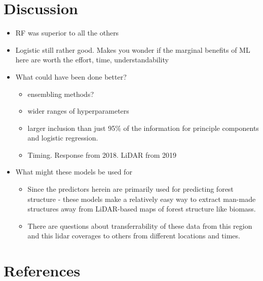 \documentclass[]{elsarticle} %
\providecommand{\tightlist}{%
  \setlength{\itemsep}{0pt}\setlength{\parskip}{0pt}}
\begin{document}
\hypertarget{discussion}{%
\section{Discussion}\label{discussion}}

\begin{itemize}
\item
  RF was superior to all the others
\item
  Logistic still rather good. Makes you wonder if the marginal benefits of ML here
  are worth the effort, time, understandability
\item
  What could have been done better?

  \begin{itemize}
  \tightlist
  \item
    ensembling methods?
  \item
    wider ranges of hyperparameters
  \item
    larger inclusion than just 95\% of the information for principle components
    and logistic regression.
  \item
    Timing. Response from 2018. LiDAR from 2019
  \end{itemize}
\item
  What might these models be used for

  \begin{itemize}
  \tightlist
  \item
    Since the predictors herein are primarily used for predicting forest
    structure - these models make a relatively easy way to extract man-made
    structures away from LiDAR-based maps of forest structure like biomass.
  \item
    There are questions about transferrability of these data from this region
    and this lidar coverages to others from different locations and times.
  \end{itemize}
\end{itemize}

\newpage{}

\hypertarget{references}{%
\section*{References}\label{references}}
\end{document}

